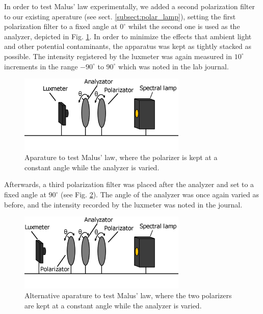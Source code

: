 \documentclass[%
 reprint,
 amsmath,amssymb,
 aps,
]{revtex4-1}
\begin{document}
    In order to test Malus' law experimentally, we added a second polarization filter to our existing aperature (see sect. \ref{subsect:polar_lamp}), setting the first polarization filter to a fixed angle at $0^\circ$ whilst the second one is used as the analyzer, depicted in Fig. \ref{fig:lux_ana_pola_lamp}. In order to minimize the effects that ambient light and other potential contaminants, the apparatus was kept as tightly stacked as possible. The intensity registered by the luxmeter was again measured in $10^\circ$ increments in the range $-90^\circ$ to $90^\circ$ which was noted in the lab journal. 

    \begin{figure}[h!]
      \center
      \includegraphics[width=8cm]{scripts/figs/diagram_2.png}
      \caption{Aparature to test Malus' law, where the polarizer is kept at a constant angle while the analyzer is varied.}
      \label{fig:lux_ana_pola_lamp}
    \end{figure}

    Afterwards, a third polarization filter was placed after the analyzer and set to a fixed angle at $90^\circ$ (see Fig. \ref{fig:lux_pola_ana_pola_lamp}). The angle of the analyzer was once again varied as before, and the intensity recorded by the luxmeter was noted in the journal.

    \begin{figure}[h!]
      \center
      \includegraphics[width=8cm]{scripts/figs/diagram_3.png}
      \caption{Alternative aparature to test Malus' law, where the two polarizers are kept at a constant angle while the analyzer is varied.}
      \label{fig:lux_pola_ana_pola_lamp}
    \end{figure}
\end{document}
